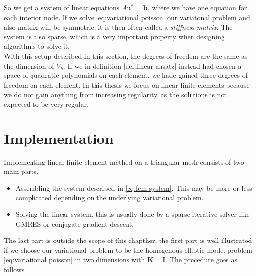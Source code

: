 \documentclass[../Main/main.tex]{subfiles}
\begin{document}
	So we get a system of linear equations $A\pmb{u}^* = \pmb{b}$, where we have one equation for each interior node. If we solve \eqref{eq:variational poisson} our variatonal problem and also matrix will be symmetric, it is then often called a \emph{stiffness matrix}. The system is also sparse, which is a very important property when designing algorithms to solve it.\\
	With this setup described in this section, the degrees of freedom are the same as the dimension of $V_h$. If we in definition \ref{def:linear ansatz} instead had chosen a space of quadratic polynomials on each element, we hade gained three degrees of freedom on each element. In this thesis we focus on linear finite elements because we do not gain anything from increasing regularity, as the solutions is not expected to be very regular. 
	\section*{Implementation}
	Implementing linear finite element method on a triangular mesh consists of two main parts.
	\begin{itemize}
		\item Assembling the system described in \eqref{eq:fem system}. This may be more or less complicated depending on the underlying variational problem.

		\item Solving the linear system, this is usually done by a sparse iterative solver like GMRES or conjugate gradient descent.
	\end{itemize}
	The last part is outside the scope of this chapther, the first part is well illustrated if we choose our variational problem to be the homogenous elliptic model problem \eqref{eq:variational poisson} in two dimensions with $\pmb{K} = \pmb{I}$. The procedure goes as follows
\end{document}

